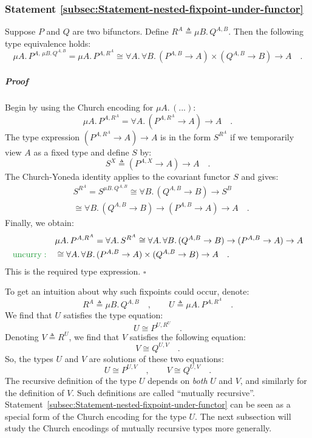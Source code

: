 \subsubsection{Statement \label{subsec:Statement-nested-fixpoint-under-functor}\ref{subsec:Statement-nested-fixpoint-under-functor}}

Suppose $P$ and $Q$ are two bifunctors. Define $R^{A}\triangleq\mu B.\,Q^{A,B}$.
Then the following type equivalence holds:
\[
\mu A.\,P^{A,\,\mu B.\,Q^{A,B}}=\mu A.\,P^{A,R^{A}}\cong\forall A.\,\forall B.\,(P^{A,B}\rightarrow A)\times(Q^{A,B}\rightarrow B)\rightarrow A\quad.
\]


\subparagraph{Proof}

Begin by using the Church encoding for $\mu A.\,(...)$:
\[
\mu A.\,P^{A,R^{A}}=\forall A.\,(P^{A,R^{A}}\rightarrow A)\rightarrow A\quad.
\]
The type expression $(P^{A,R^{A}}\rightarrow A)\rightarrow A$ is
in the form $S^{R^{A}}$ if we temporarily view $A$ as a fixed type
and define $S$ by:
\[
S^{X}\triangleq(P^{A,X}\rightarrow A)\rightarrow A\quad.
\]
The Church-Yoneda identity applies to the covariant functor $S$ and
gives:
\begin{align*}
 & S^{R^{A}}=S^{\mu B.\,Q^{A,B}}\cong\forall B.\,(Q^{A,B}\rightarrow B)\rightarrow S^{B}\\
 & \cong\forall B.\,(Q^{A,B}\rightarrow B)\rightarrow(P^{A,B}\rightarrow A)\rightarrow A\quad.
\end{align*}
Finally, we obtain:
\begin{align*}
 & \mu A.\,P^{A,R^{A}}=\forall A.\,S^{R^{A}}\cong\forall A.\,\forall B.\,(Q^{A,B}\rightarrow B)\rightarrow(P^{A,B}\rightarrow A)\rightarrow A\\
{\color{greenunder}\text{uncurry}:}\quad & \cong\forall A.\,\forall B.\,(P^{A,B}\rightarrow A)\times(Q^{A,B}\rightarrow B)\rightarrow A\quad.
\end{align*}
This is the required type expression. $\square$

To get an intuition about why such fixpoints could occur, denote:
\[
R^{A}\triangleq\mu B.\,Q^{A,B}\quad,\quad\quad U\triangleq\mu A.\,P^{A,R^{A}}\quad.
\]
We find that $U$ satisfies the type equation:
\[
U\cong P^{U,R^{U}}\quad.
\]
Denoting $V\triangleq R^{U}$, we find that $V$ satisfies the following
equation:
\[
V\cong Q^{U,V}\quad.
\]
So, the types $U$ and $V$ are solutions of these two equations:
\[
U\cong P^{U,V}\quad,\quad\quad V\cong Q^{U,V}\quad.
\]
The recursive definition of the type $U$ depends on \emph{both} $U$
and $V$, and similarly for the definition of $V$. Such definitions
are called \textsf{``}mutually recursive\textsf{''}. Statement~\ref{subsec:Statement-nested-fixpoint-under-functor}
can be seen as a special form of the Church encoding for the type
$U$. The next subsection will study the Church encodings of mutually
recursive types more generally.

